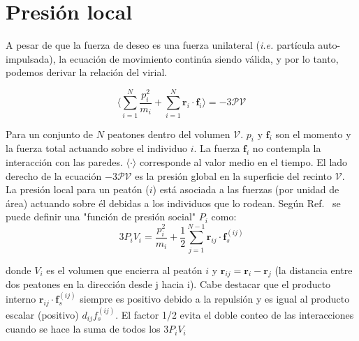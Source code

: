  
\section{Presión local}

A pesar de que la fuerza de deseo es una fuerza unilateral (\textit{i.e.} partícula auto-impulsada), la ecuación de movimiento continúa siendo válida, y por lo tanto, podemos derivar la relación del virial\cite{lion}.

\begin{equation}
 \bigg\langle\displaystyle\sum_{i=1}^N\displaystyle\frac{p_i^2}{m_i} + 
\displaystyle\sum_{i=1}^N 
\mathbf{r}_i\cdot\mathbf{f}_i\bigg\rangle=-3\mathcal{PV}\label{virial1}
\end{equation}


\noindent Para un conjunto de $N$ peatones dentro del volumen $\mathcal{V}$. $p_i$  y $\mathbf{f}_i$ son el momento y la fuerza total actuando sobre el individuo $i$. La fuerza $\mathbf{f}_i$ no contempla la interacción con las paredes.  $\langle\cdot\rangle$ corresponde al valor medio en el tiempo. El lado derecho de la ecuación $-3\mathcal{PV}$ es la presión global en la superficie del recinto $\mathcal{V}$.  \\
La presión local para un peatón ($i$) está asociada a las fuerzas (por unidad de área) actuando sobre él debidas a los individuos que lo rodean. Según Ref.~\cite{lion} se puede definir una "función de presión social" $P_i$ como:\\

\begin{equation}
3P_iV_i=\displaystyle\frac{p_i^2}{m_i} + \frac{1}{2}
\displaystyle\sum_{j=1}^{N-1}
\mathbf{r}_{ij}\cdot\mathbf{f}_s^{(ij)}\label{pv}
\end{equation}

\noindent donde $V_i$ es el volumen que encierra al peatón $i$ y 
$\mathbf{r}_{ij}=\mathbf{r}_{i}-\mathbf{r}_j$ (la distancia
entre dos peatones en la dirección desde j hacia i). Cabe destacar que el producto interno $\mathbf{r}_{ij}\cdot\mathbf{f}_s^{(ij)}$ siempre es positivo debido a la repulsión y es igual al producto escalar (positivo) $d_{ij}f_s^{(ij)}$. El factor 1/2 evita el doble conteo de las interacciones cuando se hace la suma de todos los $3P_iV_i$ \\ 

